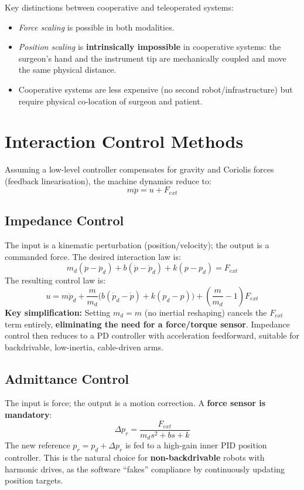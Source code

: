 \documentclass[11pt,a4paper,twoside]{report}
\begin{document}
Key distinctions between cooperative and teleoperated systems:
\begin{itemize}
    \item \textit{Force scaling} is possible in both modalities.
    \item \textit{Position scaling} is \textbf{intrinsically impossible} in cooperative systems: the surgeon's hand and the instrument tip are mechanically coupled and move the same physical distance.
    \item Cooperative systems are less expensive (no second robot/infrastructure) but require physical co-location of surgeon and patient.
\end{itemize}

\section{Interaction Control Methods}
Assuming a low-level controller compensates for gravity and Coriolis forces (feedback linearisation), the machine dynamics reduce to:
\begin{equation}
    m\ddot{p} = u + F_{ext}
\end{equation}

\subsection{Impedance Control}
The input is a kinematic perturbation (position/velocity); the output is a commanded force. The desired interaction law is:
\begin{equation}
    m_d(\ddot{p} - \ddot{p}_d) + b(\dot{p} - \dot{p}_d) + k(p - p_d) = F_{ext}
\end{equation}
The resulting control law is:
\begin{equation}
    u = m\ddot{p}_d + \frac{m}{m_d}\Big( b(\dot{p}_d - \dot{p}) + k(p_d - p) \Big) + \left( \frac{m}{m_d} - 1 \right)F_{ext}
\end{equation}
\textbf{Key simplification:} Setting $m_d = m$ (no inertial reshaping) cancels the $F_{ext}$ term entirely, \textbf{eliminating the need for a force/torque sensor}. Impedance control then reduces to a PD controller with acceleration feedforward, suitable for backdrivable, low-inertia, cable-driven arms.

\subsection{Admittance Control}
The input is force; the output is a motion correction. A \textbf{force sensor is mandatory}:
\begin{equation}
    \Delta p_r = \frac{F_{ext}}{m_d s^2 + b s + k}
\end{equation}
The new reference $p_r = p_d + \Delta p_r$ is fed to a high-gain inner PID position controller. This is the natural choice for \textbf{non-backdrivable} robots with harmonic drives, as the software ``fakes'' compliance by continuously updating position targets.
\end{document}
